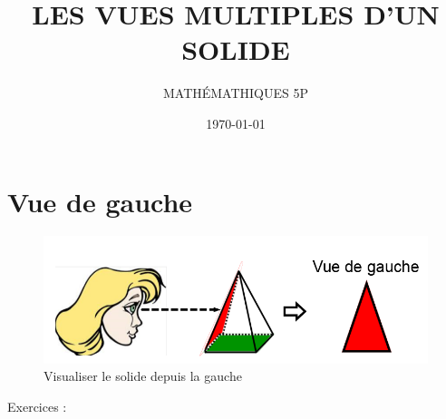 \documentclass[a4paper, 12 pt]{article}
\title{\LARGE \textbf{LES VUES MULTIPLES D'UN SOLIDE}}
\author{MATH\'EMATHIQUES 5P}
\date{\today}
\begin{document}
    \Large
    

    \begin{titlepage}
        
        \maketitle
    \end{titlepage}
    
    \setcounter{page}{2}



    \section{Vue de gauche}

    \begin{figure}[H]
        \centering
        \includegraphics[width = 1\linewidth]{vueGauche.PNG}
        \caption[]{Visualiser le solide depuis la gauche}
    \end{figure}

    
    Exercices :

   

    
    
\end{document}
